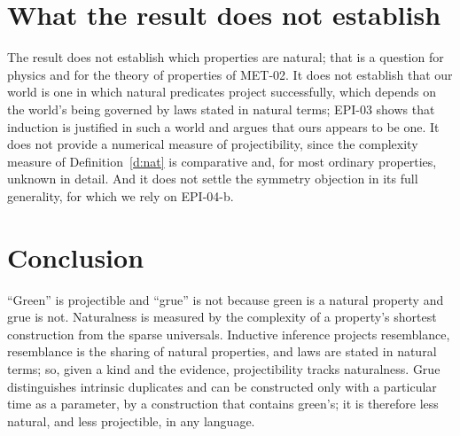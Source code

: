 \documentclass{situationist-preprint}
\begin{document}
\section{What the result does not establish}

The result does not establish which properties are natural; that is a question for physics and for the theory of properties of MET-02. It does not establish that our world is one in which natural predicates project successfully, which depends on the world's being governed by laws stated in natural terms; EPI-03 shows that induction is justified in such a world and argues that ours appears to be one. It does not provide a numerical measure of projectibility, since the complexity measure of Definition~\ref{d:nat} is comparative and, for most ordinary properties, unknown in detail. And it does not settle the symmetry objection in its full generality, for which we rely on EPI-04-b.

\section{Conclusion}

\enquote{Green} is projectible and \enquote{grue} is not because green is a natural property and grue is not. Naturalness is measured by the complexity of a property's shortest construction from the sparse universals. Inductive inference projects resemblance, resemblance is the sharing of natural properties, and laws are stated in natural terms; so, given a kind and the evidence, projectibility tracks naturalness. Grue distinguishes intrinsic duplicates and can be constructed only with a particular time as a parameter, by a construction that contains green's; it is therefore less natural, and less projectible, in any language.
\end{document}
